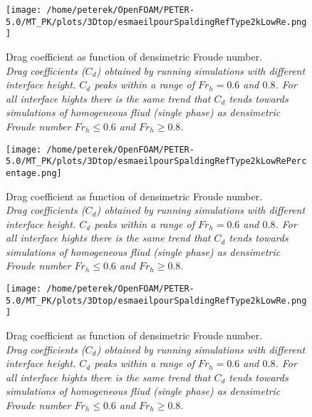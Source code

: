 \documentclass[a4paper, 12pt]{report}
\begin{document}
\begin{minipage}[t]{.45\textwidth}
	\begin{figure}[H]
		\centering
		\texttt{[image: /home/peterek/OpenFOAM/PETER-5.0/MT\_PK/plots/3Dtop/esmaeilpourSpaldingRefType2kLowRe.png]}
		\caption{Drag coefficient as function of densimetric Froude number.  \\ \textit{Drag coefficients ($C_d$) obtained by running simulations with different interface height. $C_d$ peaks within a range of $Fr_h = 0.6$ and $0.8$. For all interface hights there is the same trend that $C_d$ tends towards simulations of homogeneous fliud (single phase) as densimetric Froude number $Fr_h \leq 0.6$ and $Fr_h \geq 0.8$.}}
		\label{fig:convTestIf02U016}
	\end{figure}
\end{minipage}\hfill
\vspace{2ex}
\begin{minipage}[t]{.45\textwidth} 
	\begin{figure}[H]
		\centering
		\texttt{[image: /home/peterek/OpenFOAM/PETER-5.0/MT\_PK/plots/3Dtop/esmaeilpourSpaldingRefType2kLowRePercentage.png]}
		\caption{Drag coefficient as function of densimetric Froude number.  \\ \textit{Drag coefficients ($C_d$) obtained by running simulations with different interface height. $C_d$ peaks within a range of $Fr_h = 0.6$ and $0.8$. For all interface hights there is the same trend that $C_d$ tends towards simulations of homogeneous fliud (single phase) as densimetric Froude number $Fr_h \leq 0.6$ and $Fr_h \geq 0.8$.}}
		\label{fig:convTestIf02U022}
	\end{figure}
\end{minipage}\hfill
\vspace{2ex}

\begin{figure}[H]
	\centering
	\texttt{[image: /home/peterek/OpenFOAM/PETER-5.0/MT\_PK/plots/3Dtop/esmaeilpourSpaldingRefType2kLowRe.png]}
	\caption{Drag coefficient as function of densimetric Froude number. \\ \textit{Drag coefficients ($C_d$) obtained by running simulations with different interface height. $C_d$ peaks within a range of $Fr_h = 0.6$ and $0.8$. For all interface hights there is the same trend that $C_d$ tends towards simulations of homogeneous fliud (single phase) as densimetric Froude number $Fr_h \leq 0.6$ and $Fr_h \geq 0.8$.}}
	\label{fig:Cd}
\end{figure}
\end{document}
